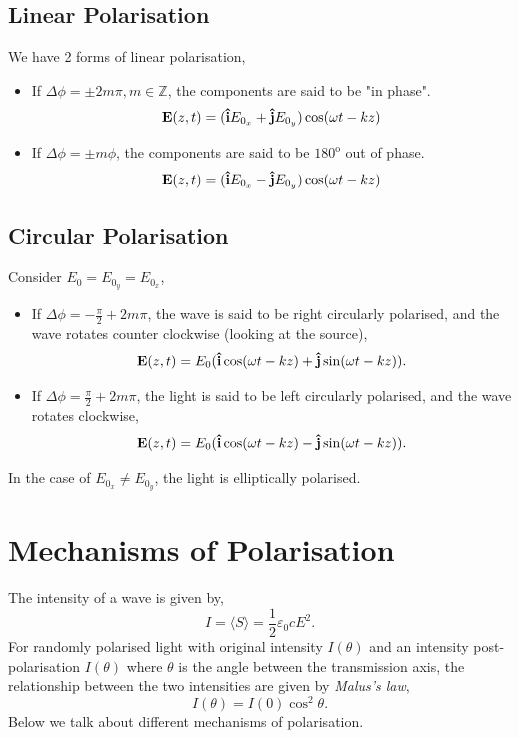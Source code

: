 \documentclass{book}
\begin{document}
{\subsection{Linear Polarisation}
We have 2 forms of linear polarisation,
\begin{itemize}
	\item If $\Delta \phi = \pm2m\pi, m \in \mathbb{Z}$, the components are said to be "in phase".
	\begin{equation}
		\vb{E}(z,t) = (\vu{i}E_{0_x} + \vu{j}E_{0_y})\cos(\omega t - kz)
	\end{equation}
	\item If $\Delta \phi = \pm m\phi$, the components are said to be $180^{\text{o}}$ out of phase.
		\begin{equation}
		\vb{E}(z,t) = (\vu{i}E_{0_x} - \vu{j}E_{0_y})\cos(\omega t - kz)
	\end{equation}
\end{itemize}
\subsection{Circular Polarisation}
Consider $E_0 = E_{0_y} = E_{0_x}$,
\begin{itemize}
	\item If $\Delta \phi = -\frac{\pi}{2} + 2m\pi$, the wave is said to be right circularly polarised, and the wave rotates counter clockwise (looking at the source),
	\begin{equation}
		\vb{E}(z,t) = E_0(\vu{i}\cos(\omega t - kz) + \vu{j}\sin(\omega t - kz)).
	\end{equation}
	\item If $\Delta \phi = \frac{\pi}{2} + 2m\pi$, the light is said to be left circularly polarised, and the wave rotates clockwise,
	\begin{equation}
		\vb{E}(z,t) = E_0(\vu{i}\cos(\omega t - kz) - \vu{j}\sin(\omega t - kz)).
	\end{equation}
\end{itemize}
In the case of $E_{0_x} \neq E_{0_y}$, the light is elliptically polarised.
\section{Mechanisms of Polarisation}
The intensity of a wave is given by,
\begin{equation}
	I = \langle S \rangle = \frac{1}{2}\varepsilon_0 cE^2.
\end{equation}
For randomly polarised light with original intensity $I(\theta)$ and an intensity post-polarisation $I(\theta)$ where $\theta$ is the angle between the transmission axis, the relationship between the two intensities are given by \textit{Malus's law},
\begin{equation}
	I(\theta) = I(0)\cos^2\theta.
\end{equation}
Below we talk about different mechanisms of polarisation.
}
\end{document}
